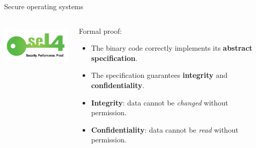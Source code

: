 \documentclass{beamer}
\begin{document}
\begin{frame}{Secure operating systems}
    \begin{columns}
        \begin{column}{0.4\textwidth}
            \begin{center}
                \includegraphics[height=2cm]{logos/seL4-logo-text-white.png}
            \end{center}
        \end{column}
        \pause
        \begin{column}{0.6\textwidth}
            Formal proof\footnotemark:
            \begin{itemize}
                \item The binary code correctly implements its \textbf{abstract specification}.
                \item The specification guarantees \textbf{integrity} and \textbf{confidentiality}.
            \end{itemize}

            \bigskip
            \pause

            \begin{itemize}
                \item \textbf{Integrity}: data cannot be \textit{changed} without permission.
                \item \textbf{Confidentiality}: data cannot be \textit{read} without permission.
            \end{itemize}
        \end{column}
    \end{columns}
\end{frame}
\end{document}
